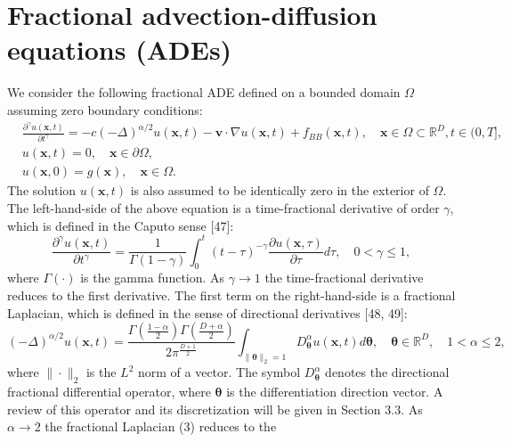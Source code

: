 \documentclass[UTF8]{article}
\begin{document}
\section{Fractional advection-diffusion equations (ADEs)}

We consider the following fractional ADE defined on a bounded domain $\Omega$ assuming zero boundary conditions:
\begin{equation}
\begin{aligned}
&\frac{\partial^\gamma u(\boldsymbol{x}, t)}{\partial t^\gamma} = -c(-\Delta)^{\alpha/2} u(\boldsymbol{x}, t) - \boldsymbol{v} \cdot \nabla u(\boldsymbol{x}, t) + f_{BB}(\boldsymbol{x}, t), \quad \boldsymbol{x} \in \Omega \subset \mathbb{R}^D, t \in (0, T], \\
&u(\boldsymbol{x}, t) = 0, \quad \boldsymbol{x} \in \partial\Omega, \\
&u(\boldsymbol{x}, 0) = g(\boldsymbol{x}), \quad \boldsymbol{x} \in \Omega.
\end{aligned}
\end{equation}
The solution $u(\boldsymbol{x}, t)$ is also assumed to be identically zero in the exterior of $\Omega$. The left-hand-side of the above equation is a time-fractional derivative of order $\gamma$, which is defined in the Caputo sense [47]:
\begin{equation}
\frac{\partial^\gamma u(\boldsymbol{x}, t)}{\partial t^\gamma} = \frac{1}{\Gamma(1-\gamma)} \int_0^t (t-\tau)^{-\gamma} \frac{\partial u(\boldsymbol{x}, \tau)}{\partial \tau} d\tau, \quad 0 < \gamma \leq 1,
\end{equation}
where $\Gamma(\cdot)$ is the gamma function. As $\gamma \to 1$ the time-fractional derivative reduces to the first derivative. The first term on the right-hand-side is a fractional Laplacian, which is defined in the sense of directional derivatives [48, 49]:
\begin{equation}
(-\Delta)^{\alpha/2} u(\boldsymbol{x}, t) = \frac{\Gamma(\frac{1-\alpha}{2}) \Gamma(\frac{D+\alpha}{2})}{2\pi^{\frac{D+1}{2}}} \int_{\|\boldsymbol{\theta}\|_2=1} D_{\boldsymbol{\theta}}^\alpha u(\boldsymbol{x}, t) d\boldsymbol{\theta}, \quad \boldsymbol{\theta} \in \mathbb{R}^D, \quad 1 < \alpha \leq 2,
\end{equation}
where $\|\cdot\|_2$ is the $L^2$ norm of a vector. The symbol $D_{\boldsymbol{\theta}}^\alpha$ denotes the directional fractional differential operator, where $\boldsymbol{\theta}$ is the differentiation direction vector. A review of this operator and its discretization will be given in Section 3.3. As $\alpha \to 2$ the fractional Laplacian (3) reduces to the
\end{document}
